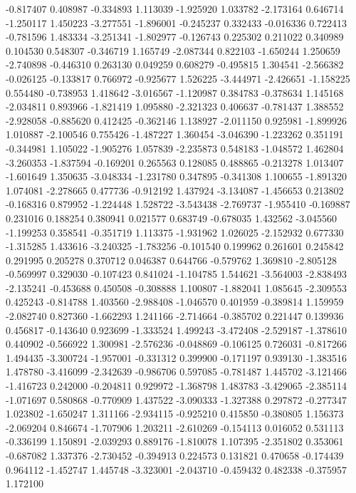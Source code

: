 -0.817407
0.408987
-0.334893
1.113039
-1.925920
1.033782
-2.173164
0.646714
-1.250117
1.450223
-3.277551
-1.896001
-0.245237
0.332433
-0.016336
0.722413
-0.781596
1.483334
-3.251341
-1.802977
-0.126743
0.225302
0.211022
0.340989
0.104530
0.548307
-0.346719
1.165749
-2.087344
0.822103
-1.650244
1.250659
-2.740898
-0.446310
0.263130
0.049259
0.608279
-0.495815
1.304541
-2.566382
-0.026125
-0.133817
0.766972
-0.925677
1.526225
-3.444971
-2.426651
-1.158225
0.554480
-0.738953
1.418642
-3.016567
-1.120987
0.384783
-0.378634
1.145168
-2.034811
0.893966
-1.821419
1.095880
-2.321323
0.406637
-0.781437
1.388552
-2.928058
-0.885620
0.412425
-0.362146
1.138927
-2.011150
0.925981
-1.899926
1.010887
-2.100546
0.755426
-1.487227
1.360454
-3.046390
-1.223262
0.351191
-0.344981
1.105022
-1.905276
1.057839
-2.235873
0.548183
-1.048572
1.462804
-3.260353
-1.837594
-0.169201
0.265563
0.128085
0.488865
-0.213278
1.013407
-1.601649
1.350635
-3.048334
-1.231780
0.347895
-0.341308
1.100655
-1.891320
1.074081
-2.278665
0.477736
-0.912192
1.437924
-3.134087
-1.456653
0.213802
-0.168316
0.879952
-1.224448
1.528722
-3.543438
-2.769737
-1.955410
-0.169887
0.231016
0.188254
0.380941
0.021577
0.683749
-0.678035
1.432562
-3.045560
-1.199253
0.358541
-0.351719
1.113375
-1.931962
1.026025
-2.152932
0.677330
-1.315285
1.433616
-3.240325
-1.783256
-0.101540
0.199962
0.261601
0.245842
0.291995
0.205278
0.370712
0.046387
0.644766
-0.579762
1.369810
-2.805128
-0.569997
0.329030
-0.107423
0.841024
-1.104785
1.544621
-3.564003
-2.838493
-2.135241
-0.453688
0.450508
-0.308888
1.100807
-1.882041
1.085645
-2.309553
0.425243
-0.814788
1.403560
-2.988408
-1.046570
0.401959
-0.389814
1.159959
-2.082740
0.827360
-1.662293
1.241166
-2.714664
-0.385702
0.221447
0.139936
0.456817
-0.143640
0.923699
-1.333524
1.499243
-3.472408
-2.529187
-1.378610
0.440902
-0.566922
1.300981
-2.576236
-0.048869
-0.106125
0.726031
-0.817266
1.494435
-3.300724
-1.957001
-0.331312
0.399900
-0.171197
0.939130
-1.383516
1.478780
-3.416099
-2.342639
-0.986706
0.597085
-0.781487
1.445702
-3.121466
-1.416723
0.242000
-0.204811
0.929972
-1.368798
1.483783
-3.429065
-2.385114
-1.071697
0.580868
-0.770909
1.437522
-3.090333
-1.327388
0.297872
-0.277347
1.023802
-1.650247
1.311166
-2.934115
-0.925210
0.415850
-0.380805
1.156373
-2.069204
0.846674
-1.707906
1.203211
-2.610269
-0.154113
0.016052
0.531113
-0.336199
1.150891
-2.039293
0.889176
-1.810078
1.107395
-2.351802
0.353061
-0.687082
1.337376
-2.730452
-0.394913
0.224573
0.131821
0.470658
-0.174439
0.964112
-1.452747
1.445748
-3.323001
-2.043710
-0.459432
0.482338
-0.375957
1.172100
